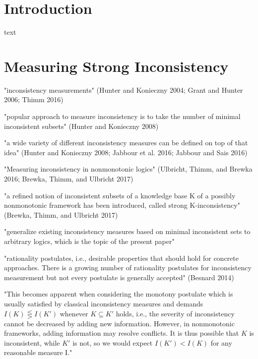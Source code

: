 \section{Introduction}
text

\section{Measuring Strong Inconsistency}
\cite{ulbricht_measuring_2018}

"inconsistency measurements"
(Hunter and Konieczny 2004; Grant and Hunter 2006; Thimm 2016)
\cite{bertossi_approaches_2005} \cite{grant_measuring_2006}

"popular approach to measure inconsistency is to take the number of minimal inconsistent subsets"
(Hunter and Konieczny 2008)
\cite{hunter_measuring_2008}

"a wide variety of different inconsistency measures can be defined on top of that idea"
(Hunter and Konieczny 2008; Jabbour et al. 2016; Jabbour and Sais 2016)
\cite{hunter_measuring_2008} \cite{jabbour_mis_2016}

"Measuring inconsistency in nonmonotonic logics"
(Ulbricht, Thimm, and Brewka 2016; Brewka, Thimm, and Ulbricht 2017)
\cite{michael_measuring_2016} \cite{brewka_strong_2017}

"a refined notion of inconsistent subsets of a knowledge base K of a possibly nonmonotonic framework has been introduced, called strong K-inconsistency"
(Brewka, Thimm, and Ulbricht 2017)
\cite{brewka_strong_2017}

"generalize existing inconsistency measures based on minimal inconsistent sets to arbitrary logics, which is the topic of the present paper"

"rationality postulates, i.e., desirable properties that should hold for concrete approaches. There is a growing number of rationality postulates for inconsistency measurement but not every postulate is generally accepted"
(Besnard 2014)
\cite{ferme_revisiting_2014}

"This becomes apparent when considering the monotony postulate which is usually satisfied by classical inconsistency measures and demands \(I(K) \lesseqgtr I(K')\) whenever \(K \subseteq K'\) holds, i.e., the severity of inconsistency cannot be decreased by adding new information. However, in nonmonotonic frameworks, adding information may resolve conflicts. It is thus possible that \(K\) is inconsistent, while \(K'\) is not, so we would expect \(I(K') < I(K)\) for any reasonable measure I."

